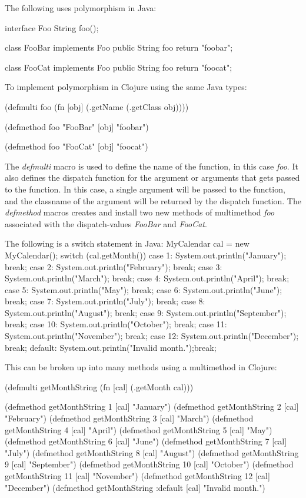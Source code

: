 The following uses polymorphism in Java:

interface Foo { 
	String foo(); 
}

class FooBar implements Foo {
        public String foo { return "foobar"; }
}

class FooCat implements Foo {
        public String foo { return "foocat"; }
}

To implement polymorphism in Clojure using the same Java types:

(defmulti foo (fn [obj] (.getName (.getClass obj))))

(defmethod foo "FooBar" [obj] "foobar")

(defmethod foo "FooCat" [obj] "foocat")

The {\it defmulti} macro is used to define the name of the function, in this
case {\it foo}. It also defines the dispatch function for the argument
or arguments that gets passed to the function. In this case, a single
argument will be passed to the function, and the classname of the
argument will be returned by the dispatch function.
The {\it defmethod} macros creates and install two new methods of
multimethod {\it foo} associated with the dispatch-values {\it FooBar}
and {\it FooCat}. 

The following is a switch statement in Java:
MyCalendar cal = new MyCalendar();
switch (cal.getMonth()) {
            case 1:  System.out.println("January"); break;
            case 2:  System.out.println("February"); break;
            case 3:  System.out.println("March"); break;
            case 4:  System.out.println("April"); break;
            case 5:  System.out.println("May"); break;
            case 6:  System.out.println("June"); break;
            case 7:  System.out.println("July"); break;
            case 8:  System.out.println("August"); break;
            case 9:  System.out.println("September"); break;
            case 10: System.out.println("October"); break;
            case 11: System.out.println("November"); break;
            case 12: System.out.println("December"); break;
            default: System.out.println("Invalid month.");break;
        }

This can be broken up into many methods using a multimethod in Clojure:

(defmulti getMonthString (fn [cal] (.getMonth cal)))

(defmethod getMonthString 1 [cal] "January")
(defmethod getMonthString 2 [cal] "February")
(defmethod getMonthString 3 [cal] "March")
(defmethod getMonthString 4 [cal] "April")
(defmethod getMonthString 5 [cal] "May")
(defmethod getMonthString 6 [cal] "June")
(defmethod getMonthString 7 [cal] "July")
(defmethod getMonthString 8 [cal] "August")
(defmethod getMonthString 9 [cal] "September")
(defmethod getMonthString 10 [cal] "October")
(defmethod getMonthString 11 [cal] "November")
(defmethod getMonthString 12 [cal] "December")
(defmethod getMonthString :default [cal] "Invalid month.")

